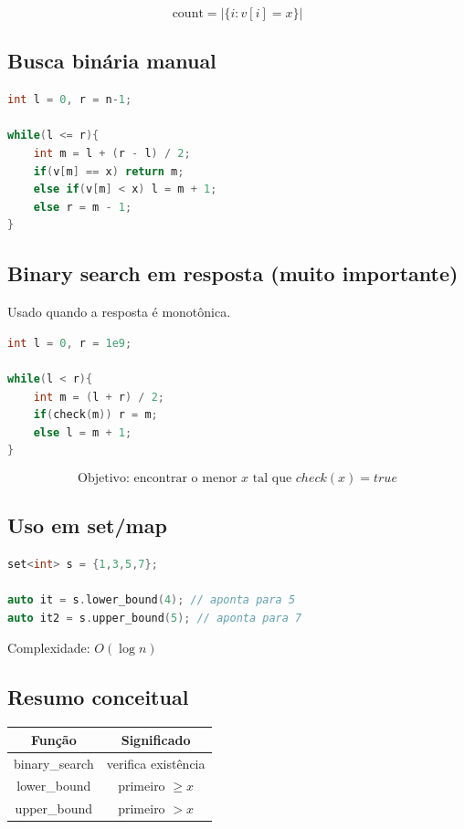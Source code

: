 \documentclass[11pt]{article}
\begin{document}
\[
\text{count} = |\{i : v[i] = x\}|
\]

\bigskip

\subsection{Busca binária manual}

\begin{lstlisting}[language=C++]
int l = 0, r = n-1;

while(l <= r){
    int m = l + (r - l) / 2;
    if(v[m] == x) return m;
    else if(v[m] < x) l = m + 1;
    else r = m - 1;
}
\end{lstlisting}

\bigskip

\subsection{Binary search em resposta (muito importante)}

Usado quando a resposta é monotônica.

\begin{lstlisting}[language=C++]
int l = 0, r = 1e9;

while(l < r){
    int m = (l + r) / 2;
    if(check(m)) r = m;
    else l = m + 1;
}
\end{lstlisting}

\[
\text{Objetivo: encontrar o menor } x \text{ tal que } check(x) = true
\]

\bigskip

\subsection{Uso em set/map}

\begin{lstlisting}[language=C++]
set<int> s = {1,3,5,7};

auto it = s.lower_bound(4); // aponta para 5
auto it2 = s.upper_bound(5); // aponta para 7
\end{lstlisting}

Complexidade: \(O(\log n)\)

\bigskip

\subsection{Resumo conceitual}

\begin{center}
\begin{tabular}{|c|c|}
\hline
Função & Significado \\
\hline
binary\_search & verifica existência \\
lower\_bound & primeiro $\geq x$ \\
upper\_bound & primeiro $> x$ \\
\hline
\end{tabular}
\end{center}
\end{document}
